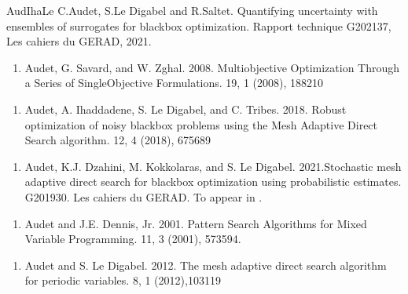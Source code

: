 \documentclass[letterpaper,10pt,english]{sphinxmanual}
\begin{document}
\begin{sphinxthebibliography}{AudIhaLe}
\sphinxAtStartPar
C.Audet, S.Le Digabel and R.Saltet.
Quantifying uncertainty with ensembles of surrogates for blackbox optimization.
Rapport technique G\sphinxhyphen{}2021\sphinxhyphen{}37, Les cahiers du GERAD, 2021.
\begin{enumerate}
%
\setcounter{enumi}{2}
\item {} 
\sphinxAtStartPar
Audet, G. Savard, and W. Zghal. 2008.  Multiobjective Optimization Through a Series of Single\sphinxhyphen{}Objective Formulations.  19, 1 (2008), 188\textendash{}210

\end{enumerate}
\begin{enumerate}
%
\setcounter{enumi}{2}
\item {} 
\sphinxAtStartPar
Audet, A. Ihaddadene, S. Le Digabel, and C. Tribes. 2018. Robust optimization of noisy blackbox problems using the Mesh Adaptive Direct Search algorithm.  12, 4 (2018), 675\textendash{}689

\end{enumerate}
\begin{enumerate}
%
\setcounter{enumi}{2}
\item {} 
\sphinxAtStartPar
Audet, K.J. Dzahini, M. Kokkolaras, and S. Le Digabel. 2021.Stochastic mesh adaptive direct search for blackbox optimization using probabilistic estimates.  G\sphinxhyphen{}2019\sphinxhyphen{}30. Les cahiers du GERAD.  To appear in .

\end{enumerate}
\begin{enumerate}
%
\setcounter{enumi}{2}
\item {} 
\sphinxAtStartPar
Audet and J.E. Dennis, Jr. 2001. Pattern Search Algorithms for Mixed Variable Programming.  11, 3 (2001), 573\textendash{}594.

\end{enumerate}
\begin{enumerate}
%
\setcounter{enumi}{2}
\item {} 
\sphinxAtStartPar
Audet and S. Le Digabel. 2012.  The mesh adaptive direct search algorithm for periodic variables.  8, 1 (2012),103\textendash{}119

\end{enumerate}
\end{sphinxthebibliography}



\renewcommand{\indexname}{Index}
\printindex
\end{document}
